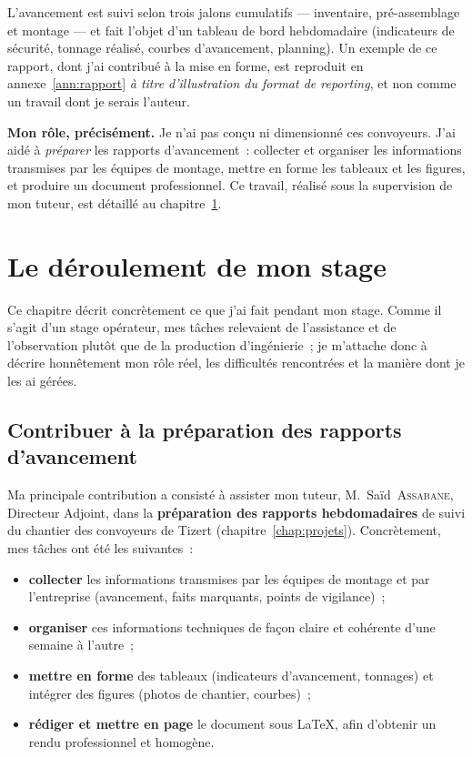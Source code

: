 \documentclass[12pt,a4paper,oneside]{report}
\begin{document}
L'avancement est suivi selon trois jalons cumulatifs --- inventaire, pré-assemblage et montage --- et fait l'objet d'un tableau de bord hebdomadaire (indicateurs de sécurité, tonnage réalisé, courbes d'avancement, planning). Un exemple de ce rapport, dont j'ai contribué à la mise en forme, est reproduit en annexe~\ref{ann:rapport} \emph{à titre d'illustration du format de reporting}, et non comme un travail dont je serais l'auteur.

\begin{presente}
\textbf{Mon rôle, précisément.} Je n'ai pas conçu ni dimensionné ces convoyeurs. J'ai aidé à \emph{préparer} les rapports d'avancement~: collecter et organiser les informations transmises par les équipes de montage, mettre en forme les tableaux et les figures, et produire un document professionnel. Ce travail, réalisé sous la supervision de mon tuteur, est détaillé au chapitre~\ref{chap:stage}.
\end{presente}
\chapter{Le déroulement de mon stage}
\label{chap:stage}

Ce chapitre décrit concrètement ce que j'ai fait pendant mon stage. Comme il s'agit d'un stage opérateur, mes tâches relevaient de l'assistance et de l'observation plutôt que de la production d'ingénierie~; je m'attache donc à décrire honnêtement mon rôle réel, les difficultés rencontrées et la manière dont je les ai gérées.

\section{Contribuer à la préparation des rapports d'avancement}

Ma principale contribution a consisté à assister mon tuteur, M.~Saïd~\textsc{Assabane}, Directeur Adjoint, dans la \textbf{préparation des rapports hebdomadaires} de suivi du chantier des convoyeurs de Tizert (chapitre~\ref{chap:projets}). Concrètement, mes tâches ont été les suivantes~:

\begin{itemize}
\item \textbf{collecter} les informations transmises par les équipes de montage et par l'entreprise (avancement, faits marquants, points de vigilance)~;
\item \textbf{organiser} ces informations techniques de façon claire et cohérente d'une semaine à l'autre~;
\item \textbf{mettre en forme} des tableaux (indicateurs d'avancement, tonnages) et intégrer des figures (photos de chantier, courbes)~;
\item \textbf{rédiger et mettre en page} le document sous \LaTeX, afin d'obtenir un rendu professionnel et homogène.
\end{itemize}
\end{document}

